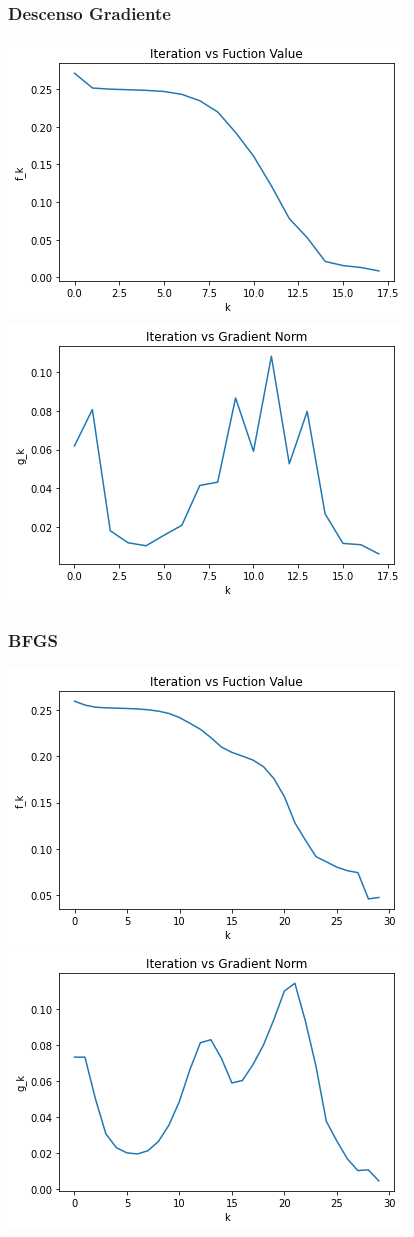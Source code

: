 \documentclass[11pt,letterpaper]{article}
\theoremstyle{definition}
\theoremstyle{definition}
\theoremstyle{definition}
\begin{document}
\subsubsection{Descenso Gradiente}
\begin{center}
	\includegraphics[width=0.7\linewidth]{graficas/sd_f_2}
	\includegraphics[width=0.7\linewidth]{graficas/sd_g_2}
\end{center}
\subsubsection{BFGS}
\begin{center}
	\includegraphics[width=0.7\linewidth]{graficas/bfgs_f_2}
	\includegraphics[width=0.7\linewidth]{graficas/bfgs_g_2}
\end{center}
\end{document}
